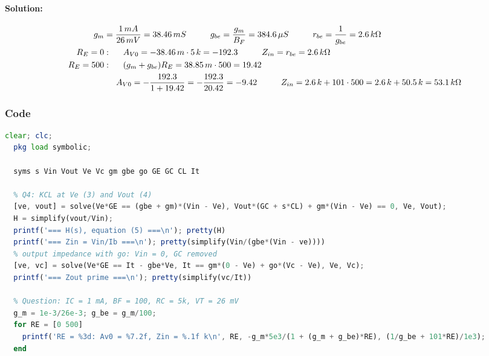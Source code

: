 \paragraph{Solution:}
\begin{align*}
  g_m &= \frac{1\,mA}{26\,mV} = 38.46\,mS \hspace{1cm} g_{be} = \frac{g_m}{B_F} = 384.6\,\mu S \hspace{1cm} r_{be} = \frac{1}{g_{be}} = 2.6\,k\Omega \\
  R_E = 0 &: \hspace{0.5cm} A_{V0} = -38.46\,m \cdot 5\,k = -192.3 \hspace{1cm} Z_{in} = r_{be} = 2.6\,k\Omega \\
  R_E = 500 &: \hspace{0.5cm} (g_m + g_{be}) R_E = 38.85\,m \cdot 500 = 19.42 \\
  &\hspace{0.5cm} A_{V0} = -\frac{192.3}{1 + 19.42} = -\frac{192.3}{20.42} = -9.42 \hspace{1cm} Z_{in} = 2.6\,k + 101 \cdot 500 = 2.6\,k + 50.5\,k = 53.1\,k\Omega
\end{align*}

\subsubsection{Code}
\begin{lstlisting}[language=Octave]
  clear; clc;
  pkg load symbolic;

  syms s Vin Vout Ve Vc gm gbe go GE GC CL It

  % Q4: KCL at Ve (3) and Vout (4)
  [ve, vout] = solve(Ve*GE == (gbe + gm)*(Vin - Ve), Vout*(GC + s*CL) + gm*(Vin - Ve) == 0, Ve, Vout);
  H = simplify(vout/Vin);
  printf('=== H(s), equation (5) ===\n'); pretty(H)
  printf('=== Zin = Vin/Ib ===\n'); pretty(simplify(Vin/(gbe*(Vin - ve))))
  % output impedance with go: Vin = 0, GC removed
  [ve, vc] = solve(Ve*GE == It - gbe*Ve, It == gm*(0 - Ve) + go*(Vc - Ve), Ve, Vc);
  printf('=== Zout prime ===\n'); pretty(simplify(vc/It))

  % Question: IC = 1 mA, BF = 100, RC = 5k, VT = 26 mV
  g_m = 1e-3/26e-3; g_be = g_m/100;
  for RE = [0 500]
    printf('RE = %3d: Av0 = %7.2f, Zin = %.1f k\n', RE, -g_m*5e3/(1 + (g_m + g_be)*RE), (1/g_be + 101*RE)/1e3);
  end
\end{lstlisting}
